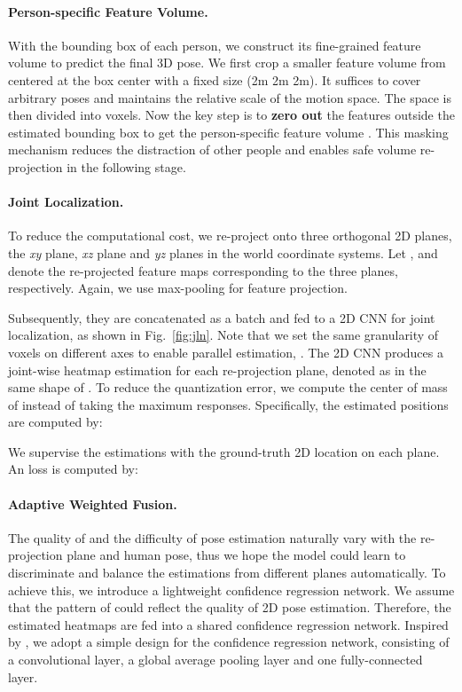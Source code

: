 \paragraph{Person-specific Feature Volume.} With the bounding box of each person, we construct its fine-grained feature volume to predict the final 3D pose. We first crop a smaller feature volume  from  centered at the box center with a fixed size (\ie 2m  2m  2m). It suffices to cover arbitrary poses and maintains the relative scale of the motion space. The space is then divided into  voxels. Now the key step is to \textbf{zero out} the features outside the estimated bounding box to get the person-specific feature volume . This masking mechanism reduces the distraction of other people and enables safe volume re-projection in the following stage. 

\paragraph{Joint Localization.} To reduce the computational cost, we re-project  onto three orthogonal 2D planes, \ie the \textit{xy} plane, \textit{xz} plane and \textit{yz} planes in the world coordinate systems. Let ,  and  denote the re-projected feature maps corresponding to the three planes, respectively. Again, we use max-pooling for feature projection. 

Subsequently, they are concatenated as a batch and fed to a 2D CNN for joint localization, as shown in Fig.~\ref{fig:jln}. Note that we set the same granularity of voxels on different axes to enable parallel estimation, \ie . The 2D CNN produces a joint-wise heatmap estimation for each re-projection plane, denoted as  in the same shape of . To reduce the quantization error, we compute the center of mass of  instead of taking the maximum responses. Specifically, the estimated positions  are computed by:





We supervise the estimations with the ground-truth 2D location  on each plane. An  loss is computed by:



\paragraph{Adaptive Weighted Fusion.} The quality of  and the difficulty of pose estimation naturally vary with the re-projection plane and human pose, thus we hope the model could learn to discriminate and balance the estimations from different planes automatically. To achieve this, we introduce a lightweight confidence regression network. We assume that the pattern of  could reflect the quality of 2D pose estimation. Therefore, the estimated heatmaps  are fed into a shared confidence regression network. Inspired by \cite{zhang2021adafuse}, we adopt a simple design for the confidence regression network, consisting of a convolutional layer, a global average pooling layer and one fully-connected layer. 

